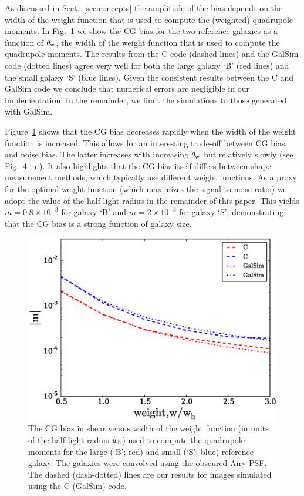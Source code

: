 \documentclass[useAMS,usenatbib]{mnras}
\begin{document}
As discussed in Sect.~\ref{sec:concepts} the amplitude of the bias depends on the width of the weight function that is used to compute the (weighted) quadrupole moments. In Fig.~\ref{fig:biasofweight} we show the CG bias for the two reference galaxies as a function of $\theta_{\rm w}$, the width of the weight function that is used to compute the quadrupole moments. The results from the {\sc C} code (dashed lines) and the {\sc GalSim} code (dotted lines) agree very well for both the large galaxy `B' (red lines) and the small galaxy `S' (blue lines). Given the consistent results between the {\sc C} and {\sc GalSim} code we conclude that numerical errors are negligible in our implementation. In the remainder, we limit the simulations to those generated with {\sc GalSim}.

Figure~\ref{fig:biasofweight} shows that the CG bias decreases rapidly when the width of the weight function is increased. This allows for an interesting trade-off between CG bias and noise bias. The latter increases with increasing $\theta_{\rm w}$ but relatively slowly (see Fig.~4 in ). It also highlights that the CG bias itself differs between shape measurement methods, which typically use different weight functions. As a proxy for the optimal weight function (which maximizes the signal-to-noise ratio) we adopt the value of the  half-light radius in the remainder of this paper. This yields $m=0.8\times10^{-3}$ for galaxy `B' and $m=2\times10^{-3}$ for galaxy `S', demonstrating that the CG bias is a strong function of galaxy size.

%
\begin{figure}
  \centerline{\includegraphics[width=\hsize]{zweight_airy.eps}}
\caption{The CG bias in shear versus width of the weight function (in
  units of the half-light radius $w_{\rm h}$) used to compute the
  quadrupole moments for the large (`B'; red) and small (`S';
  blue) reference galaxy. The galaxies were convolved using the obscured Airy
  PSF. The dashed (dash-dotted) lines are our
  results for images simulated using the {\sc C} ({\sc GalSim}) code.}
\label{fig:biasofweight}
\end{figure}
%
\end{document}
